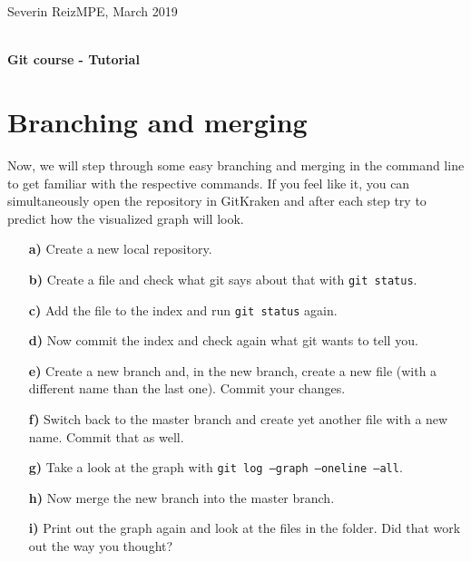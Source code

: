 \documentclass[11pt]{article}
\begin{document}
  {\normalsize  
Severin Reiz\hfill MPE, March 2019\\ 
    \mbox{}\\ [2ex] }

\thispagestyle{empty}
\begin{center}
    {\LARGE\sffamily\bfseries Git course - Tutorial}
\end{center}


\section*{Branching and merging}
Now, we will step through some easy branching and merging in the command line to get familiar with the respective commands. If you feel like it, you can simultaneously open the repository in GitKraken and after each step try to predict how the visualized graph will look.

\begin{itemize}
\item[\bf{a)}] Create a new local repository.
\item[\bf{b)}] Create a file and check what git says about that with \texttt{git status}.
\item[\bf{c)}] Add the file to the index and run \texttt{git status} again.
\item[\bf{d)}] Now commit the index and check again what git wants to tell you.
\item[\bf{e)}] Create a new branch and, in the new branch, create a new file (with a different name than the last one). Commit your changes.
\item[\bf{f)}] Switch back to the master branch and create yet another file with a new name. Commit that as well.
\item[\bf{g)}] Take a look at the graph with \texttt{git log --graph --oneline --all}.
\item[\bf{h)}] Now merge the new branch into the master branch.
\item[\bf{i)}] Print out the graph again and look at the files in the folder. Did that work out the way you thought?
\end{itemize}
\end{document}
